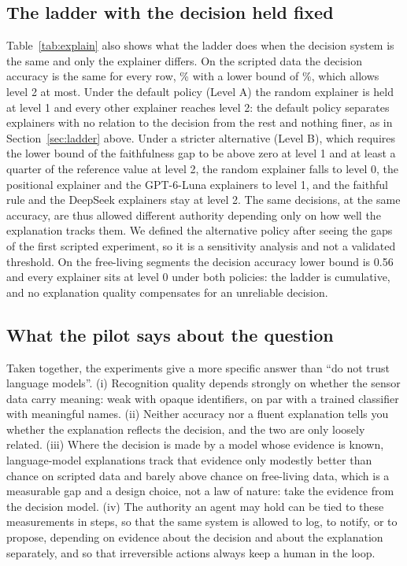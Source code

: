 \documentclass[11pt,a4paper]{article}
\begin{document}
\subsection{The ladder with the decision held fixed}
Table~\ref{tab:explain} also shows what the ladder does when the decision system is the same and only the explainer differs. On the scripted data the decision accuracy is the same for every row, \DecAccAdl\% with a lower bound of \DecAccAdlLo\%, which allows level 2 at most. Under the default policy (Level A) the random explainer is held at level 1 and every other explainer reaches level 2: the default policy separates explainers with no relation to the decision from the rest and nothing finer, as in Section~\ref{sec:ladder} above. Under a stricter alternative (Level B), which requires the lower bound of the faithfulness gap to be above zero at level 1 and at least a quarter of the reference value at level 2, the random explainer falls to level 0, the positional explainer and the GPT-6-Luna explainers to level 1, and the faithful rule and the DeepSeek explainers stay at level 2. The same decisions, at the same accuracy, are thus allowed different authority depending only on how well the explanation tracks them. We defined the alternative policy after seeing the gaps of the first scripted experiment, so it is a sensitivity analysis and not a validated threshold. On the free-living segments the decision accuracy lower bound is 0.56 and every explainer sits at level 0 under both policies: the ladder is cumulative, and no explanation quality compensates for an unreliable decision.

\subsection{What the pilot says about the question}
Taken together, the experiments give a more specific answer than ``do not trust language models''. (i) Recognition quality depends strongly on whether the sensor data carry meaning: weak with opaque identifiers, on par with a trained classifier with meaningful names. (ii) Neither accuracy nor a fluent explanation tells you whether the explanation reflects the decision, and the two are only loosely related. (iii) Where the decision is made by a model whose evidence is known, language-model explanations track that evidence only modestly better than chance on scripted data and barely above chance on free-living data, which is a measurable gap and a design choice, not a law of nature: take the evidence from the decision model. (iv) The authority an agent may hold can be tied to these measurements in steps, so that the same system is allowed to log, to notify, or to propose, depending on evidence about the decision and about the explanation separately, and so that irreversible actions always keep a human in the loop.
\end{document}
